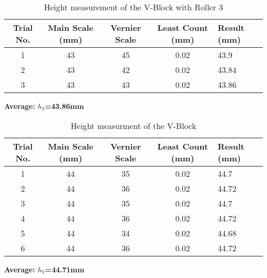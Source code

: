 \documentclass[12pt]{article}
\begin{document}
\begin{table}[H]
	\centering
	\caption{Height measurement of the V-Block with Roller 3}
	\begin{tabularx}{\textwidth}{ccccX}
		\toprule
		\textbf{Trial No.} & \textbf{Main Scale (mm)} & \textbf{Vernier Scale} & \textbf{Least Count (mm)} & \textbf{Result (mm)} \\
		\midrule
		1                  & 43                       & 45                     & 0.02                      & 43.9                 \\
		2                  & 43                       & 42                     & 0.02                      & 43.84                \\
		3                  & 43                       & 43                     & 0.02                      & 43.86                \\
		\bottomrule
	\end{tabularx}
\end{table}
\textbf{Average: $h_3$=43.86mm}

\begin{table}[H]
	\centering
	\caption{Height measurment of the V-Block}
	\begin{tabularx}{\textwidth}{ccccX}
		\toprule
		\textbf{Trial No.} & \textbf{Main Scale (mm)} & \textbf{Vernier Scale} & \textbf{Least Count (mm)} & \textbf{Result (mm)} \\
		\midrule
		1                  & 44                       & 35                     & 0.02                      & 44.7                 \\
		2                  & 44                       & 36                     & 0.02                      & 44.72                \\
		3                  & 44                       & 35                     & 0.02                      & 44.7                 \\
		4                  & 44                       & 36                     & 0.02                      & 44.72                \\
		5                  & 44                       & 34                     & 0.02                      & 44.68                \\
		6                  & 44                       & 36                     & 0.02                      & 44.72                \\
		\bottomrule
	\end{tabularx}
\end{table}
\textbf{Average: $h_{V}$=44.71mm}
\end{document}
